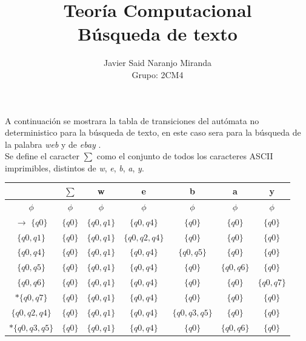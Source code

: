 \documentclass[12pt,letterpaper]{article}
\author{Javier Said Naranjo Miranda\\ Grupo: 2CM4}
\title{Teoría Computacional\\ B\'usqueda de texto}
\begin{document}
\maketitle
\justify
A continuación se mostrara la tabla de transiciones del aut\'omata no deterministico para la b\'usqueda de texto, en este caso sera para la b\'usqueda de la palabra \textit{web} y de \textit{ebay} .\\
Se define el caracter $\sum $ como el conjunto de todos los caracteres ASCII imprimibles, distintos de \textit{w},  \textit{e}, \textit{b}, \textit{a}, \textit{y}.\\
\begin{center}
\begin{tabular}{| c || c | c | c | c | c | c |} \hline
 & $ \sum $ & w & e & b & a & y \\
\hline\hline
$\phi$ & $\phi$ & $\phi$ & $\phi$ & $\phi$ & $\phi$ & $\phi$ \\
\hline
$\rightarrow$ $\lbrace q0 \rbrace$ & $\lbrace q0 \rbrace$ & $\lbrace q0, q1 \rbrace$ & $\lbrace q0, q4 \rbrace$ & $\lbrace q0 \rbrace$ & $\lbrace q0 \rbrace$ & $\lbrace q0 \rbrace$ \\
\hline
$\lbrace q0, q1 \rbrace$ & $\lbrace q0 \rbrace$ & $\lbrace q0, q1 \rbrace$ & $\lbrace q0, q2, q4 \rbrace$ & $\lbrace q0 \rbrace$ & $\lbrace q0 \rbrace$ & $\lbrace q0 \rbrace$ \\
\hline
$\lbrace q0, q4 \rbrace$ & $\lbrace q0 \rbrace$ & $\lbrace q0, q1 \rbrace$ & $\lbrace q0, q4 \rbrace$ & $\lbrace q0, q5 \rbrace$ & $\lbrace q0 \rbrace$ & $\lbrace q0 \rbrace$ \\
\hline
$\lbrace q0, q5 \rbrace$ & $\lbrace q0 \rbrace$ & $\lbrace q0, q1 \rbrace$ & $\lbrace q0, q4 \rbrace$ & $\lbrace q0 \rbrace$ & $\lbrace q0, q6 \rbrace$ & $\lbrace q0 \rbrace$ \\
\hline
$\lbrace q0, q6 \rbrace$ & $\lbrace q0 \rbrace$ & $\lbrace q0, q1 \rbrace$ & $\lbrace q0, q4 \rbrace$ & $\lbrace q0 \rbrace$ & $\lbrace q0 \rbrace$ & $\lbrace q0, q7 \rbrace$ \\
\hline
$*\lbrace q0, q7 \rbrace$ & $\lbrace q0 \rbrace$ & $\lbrace q0, q1 \rbrace$ & $\lbrace q0, q4 \rbrace$ & $\lbrace q0 \rbrace$ & $\lbrace q0 \rbrace$ & $\lbrace q0 \rbrace$ \\
\hline
$\lbrace q0, q2, q4 \rbrace$ & $\lbrace q0 \rbrace$ & $\lbrace q0, q1 \rbrace$ & $\lbrace q0, q4 \rbrace$ & $\lbrace q0, q3, q5 \rbrace$ & $\lbrace q0 \rbrace$ & $\lbrace q0 \rbrace$ \\
\hline
$*\lbrace q0, q3, q5 \rbrace$ & $\lbrace q0 \rbrace$ & $\lbrace q0, q1 \rbrace$ & $\lbrace q0, q4 \rbrace$ & $\lbrace q0 \rbrace$ & $\lbrace q0, q6 \rbrace$ & $\lbrace q0 \rbrace$ \\
\hline
     
\end{tabular}
\end{center}
\end{document}

